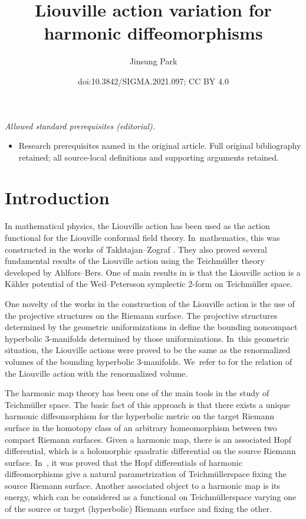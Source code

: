\documentclass[10pt,a4paper]{amsart}
\title{Liouville action variation for harmonic diffeomorphisms}
\author{Jinsung Park}
\date{doi:10.3842/SIGMA.2021.097; CC BY 4.0}
\numberwithin{equation}{section}
\newcommand{\Te}{Teichm\"{u}ller\:}
\begin{document}
\maketitle
\noindent\textit{Allowed standard prerequisites (editorial).}\begin{itemize}
\item Research prerequisites named in the original article. Full original bibliography retained; all source-local definitions and supporting arguments retained.
\end{itemize}\medskip
\section{Introduction}

In mathematical physics, the Liouville action has been used as the action functional for the Liouville conformal field theory. In~mathematics, this was constructed in the works of Takhtajan--Zograf \cite{TZ88-1, TZ88-2}. They also proved several fundamental results of the Liouville action using the Teichm\"uller theory developed by Ahlfors--Bers. One of main results in \cite{TZ88-1, TZ88-2} is that the Liouville action is a K\"ahler potential of the Weil--Petersson symplectic 2-form on Teichm\"uller space.

One novelty of the works \cite{TZ88-1, TZ88-2} in the construction of the Liouville action
is the use of the projective structures on the Riemann surface. The projective structures determined by the geometric uniformizations in \cite{2, TZ88-1, TZ88-2} define the bounding noncompact hyperbolic 3-manifolds determined by those uniformizations. In~this geometric situation, the Liouville actions were proved to be the same as the renormalized volumes of the bounding hyperbolic 3-manifolds. We~refer to
\cite{Kras00, Kras-Sch08, 1, PT17, 2} for the relation of the Liouville action with the renormalized volume.

The harmonic map theory has been one of the main tools in the study of Teichm\"uller space.
The basic fact of this approach is that
there exists a unique harmonic diffeomorphism for the hyperbolic metric on the target Riemann surface in the homotopy class of an arbitrary homeomorphism between two compact Riemann surfaces.
Given a harmonic map, there is an associated Hopf differential, which is a holomorphic quadratic differential
on the source Riemann surface. In~\cite{Sam,W89}, it was proved that the Hopf differentials of harmonic diffeomorphisms give a natural parametrization of \Te space
fixing the source Riemann surface. Another asso\-ciated object to a harmonic map is its energy,
which can be considered as a functional on \Te space varying one of the source or target (hyperbolic) Riemann surface and fixing the other.
\end{document}
